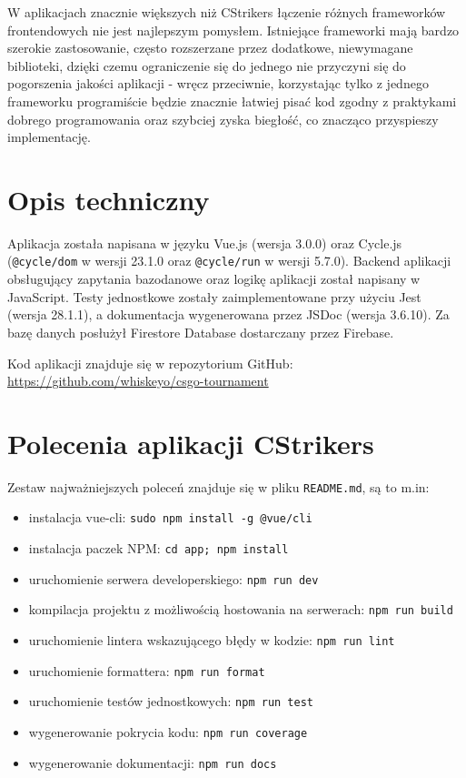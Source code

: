 \documentclass[shortabstract]{iithesis}
\theoremstyle{definition} \newtheorem{definition}{Definicja}[]
\theoremstyle{remark} \newtheorem{remark}[definition]{Observation}
\theoremstyle{plain} \newtheorem{theorem}[definition]{Theorem}
\theoremstyle{plain} \newtheorem{lemma}[definition]{Lemma}
\begin{document}
W aplikacjach znacznie większych niż CStrikers łączenie różnych frameworków frontendowych nie jest najlepszym pomysłem. Istniejące frameworki mają bardzo szerokie zastosowanie, często rozszerzane przez dodatkowe, niewymagane biblioteki, dzięki czemu ograniczenie się do jednego nie przyczyni się do pogorszenia jakości aplikacji - wręcz przeciwnie, korzystając tylko z jednego frameworku programiście będzie znacznie łatwiej pisać kod zgodny z praktykami dobrego programowania oraz szybciej zyska biegłość, co znacząco przyspieszy implementację.


\chapter{Opis techniczny}
Aplikacja została napisana w języku Vue.js (wersja 3.0.0) oraz Cycle.js (\texttt{@cycle/dom} w wersji 23.1.0 oraz \texttt{@cycle/run} w wersji 5.7.0). Backend aplikacji obsługujący zapytania bazodanowe oraz logikę aplikacji został napisany w JavaScript. Testy jednostkowe zostały zaimplementowane przy użyciu Jest (wersja 28.1.1), a dokumentacja wygenerowana przez JSDoc (wersja 3.6.10). Za bazę danych posłużył Firestore Database dostarczany przez Firebase.

Kod aplikacji znajduje się w repozytorium GitHub:\newline
\url{https://github.com/whiskeyo/csgo-tournament}

\chapter{Polecenia aplikacji CStrikers}
Zestaw najważniejszych poleceń znajduje się w pliku \texttt{README.md}, są to m.in:
\begin{itemize}
    \item instalacja vue-cli: \texttt{sudo npm install -g @vue/cli}
    \item instalacja paczek NPM: \texttt{cd app; npm install}
    \item uruchomienie serwera developerskiego: \texttt{npm run dev}
    \item kompilacja projektu z możliwością hostowania na serwerach: \texttt{npm run build}
    \item uruchomienie lintera wskazującego błędy w kodzie: \texttt{npm run lint}
    \item uruchomienie formattera: \texttt{npm run format}
    \item uruchomienie testów jednostkowych: \texttt{npm run test}
    \item wygenerowanie pokrycia kodu: \texttt{npm run coverage}
    \item wygenerowanie dokumentacji: \texttt{npm run docs}
\end{itemize}
\end{document}
